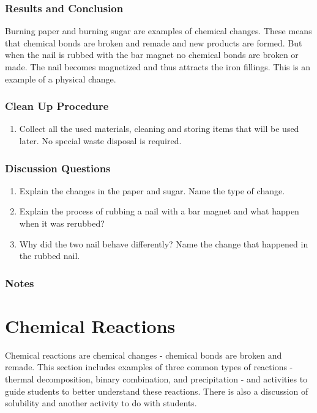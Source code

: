 \subsubsection*{Results and Conclusion}
Burning paper and burning sugar are examples of chemical changes. These means that chemical bonds are broken and remade and new products are formed. But when the nail is rubbed with the bar magnet no chemical bonds are broken or made. The nail becomes magnetized and thus attracts the iron fillings. This is an example of a physical change.

\subsubsection*{Clean Up Procedure}
\begin{enumerate}
\item{Collect all the used materials, cleaning and storing items that will be used later. No special waste disposal is required.}
\end{enumerate}

\subsubsection*{Discussion Questions}
\begin{enumerate}
\item{Explain the changes in the paper and sugar. Name the type of change.}
\item{Explain the process of rubbing a nail with a bar magnet and what happen when it was rerubbed?}
\item{Why did the two nail behave differently? Name the change that happened in the rubbed nail.}
\end{enumerate}

\subsubsection*{Notes}

\section{ Chemical Reactions}
Chemical reactions are chemical changes - chemical bonds are broken and remade. This section includes examples of three common types of reactions - thermal decomposition, binary combination, and precipitation - and activities to guide students to better understand these reactions. There is also a discussion of solubility and another activity to do with students.
